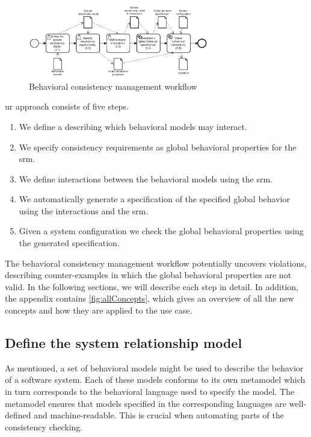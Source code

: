 \documentclass{jot}
\begin{document}
\begin{figure}[h]
    \centering
    \includegraphics[width=0.7\textwidth]{figures/workflow.pdf}
    \caption{Behavioral consistency management workflow}
    \label{fig:approach}
\end{figure}

ur approach consists of five steps.
\begin{enumerate}
    \item We define a  describing which behavioral models may interact.
    \item We specify consistency requirements as global behavioral properties for the \gls*{srm}.
    \item We define interactions between the behavioral models using the \gls*{srm}.
    \item We automatically generate a specification of the specified global behavior using the interactions and the \gls*{srm}.
    \item Given a system configuration we check the global behavioral properties using the generated specification.
\end{enumerate}
The behavioral consistency management workflow potentially uncovers violations, describing counter-examples in which the global behavioral properties are not valid.
In the following sections, we will describe each step in detail.
In addition, the appendix contains \cref{fig:allConcepts}, which gives an overview of all the new concepts and how they are applied to the use case.


\subsection{Define the system relationship model}
As mentioned, a set of behavioral models might be used to describe the behavior of a software system.
Each of these models conforms to its own metamodel which in turn corresponds to the behavioral language used to specify the model.
The metamodel ensures that models specified in the corresponding languages are well-defined and machine-readable.
This is crucial when automating parts of the consistency checking.
\end{document}
